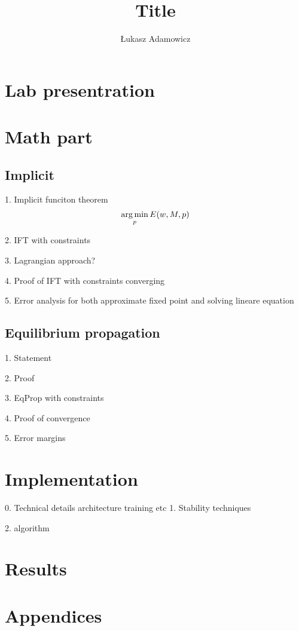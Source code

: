 \documentclass[a4paper,10pt]{report}
\title{Title}
\author{Łukasz Adamowicz}
\begin{document}
\maketitle

\begin{abstract}
\end{abstract}



\section{ Lab presentration}

 \section{Math part}

 \subsection{Implicit}
1. Implicit funciton theorem
\[\operatorname*{arg\,min}_p E(w,M,p)\]

2. IFT with constraints

3. Lagrangian approach?

4. Proof of IFT with constraints converging

5. Error analysis for both approximate fixed point and solving lineare equation
\subsection{ Equilibrium propagation}

1. Statement

2. Proof

3. EqProp with constraints

4. Proof of convergence

5. Error margins
\section{ Implementation}
0. Technical details
    architecture
    training
    etc
1. Stability techniques

2. algorithm
\section{Results}


\nocite{*}





\section{Appendices}
\end{document}
